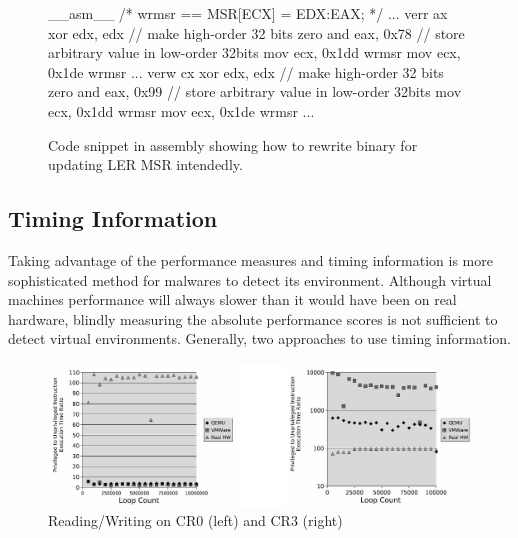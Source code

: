 \begin{figure}[h]
\begin{lstc}
__asm__ {
	/* wrmsr == MSR[ECX] = EDX:EAX; */
	...
	verr ax
	xor edx, edx // make high-order 32 bits zero
	and eax, 0x78 // store arbitrary value in low-order 32bits
	mov ecx, 0x1dd
	wrmsr 
	mov ecx, 0x1de
	wrmsr
	...
	verw cx
	xor edx, edx // make high-order 32 bits zero
	and eax, 0x99 // store arbitrary value in low-order 32bits
	mov ecx, 0x1dd
	wrmsr
	mov ecx, 0x1de
	wrmsr
	...
}

\end{lstc}
\caption{\label{fig:wrmsr} Code snippet in assembly showing how to rewrite binary for updating LER MSR intendedly. }
\end{figure}

\subsection{Timing Information}
\label{sec:approach-timing}
Taking advantage of the performance measures and timing information is more sophisticated method for malwares to detect its environment. Although virtual machine\textquotesingle s performance will always slower than it would have been on real hardware, blindly measuring the absolute performance scores is not sufficient to detect virtual environments.\cite{raffetseder2007} Generally, two approaches to use timing information.

\begin{figure}[!t]
	\centering
	\includegraphics[width=\textwidth]{figure/comp_inst.jpg}
	\caption{Reading/Writing on CR0 (left) and CR3 (right)}
	\label{fig:comparison_of_instructions}
\end{figure}

